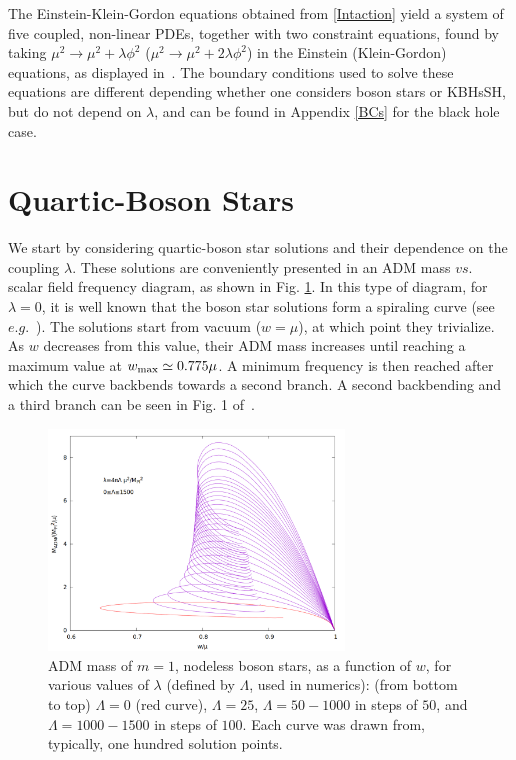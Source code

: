 The Einstein-Klein-Gordon equations obtained from \eqref{Intaction} yield a system of five coupled, non-linear PDEs, together with two constraint equations, found 
by taking $\mu^2\to \mu^2+ \lambda \phi^2$ ($\mu^2\to \mu^2+2\lambda \phi^2$) in the Einstein (Klein-Gordon) equations, as displayed in~\cite{Herdeiro:2015gia}.
The boundary conditions used to solve these
equations are different depending whether one considers boson stars or KBHsSH, but do not depend on $\lambda$, and can be found in Appendix \ref{BCs} for the black hole case.


\section{Quartic-Boson Stars}
\label{sec_II}
We start by considering quartic-boson star solutions and their dependence on the coupling $\lambda$. These solutions are  conveniently presented in an ADM mass $vs.$ scalar field frequency diagram, as shown in Fig. \ref{fig:w-vs-M-BSs}. In this type of diagram, for $\lambda=0$, it is well known that the boson star solutions form a spiraling curve (see $e.g.$~\cite{Herdeiro:2015gia}). The solutions start from vacuum ($w=\mu$), at which point they trivialize. As $w$ decreases from this value, their ADM mass increases until reaching a maximum value at $w_{\rm max}\simeq 0.775 \mu$. A minimum frequency is then reached after which the curve backbends towards a second branch. A second backbending and a third branch can be seen in  Fig. 1 of~\cite{Herdeiro:2015gia}.

\begin{figure}[h!]
  \begin{center}
    \includegraphics[width=0.7\textwidth]{papers/selfInteractions/w-vs-M-BSs2.png}
  \end{center}
  \caption{ADM mass of $m=1$, nodeless boson stars, as a function of $w$, for various values of $\lambda$ (defined by $\Lambda$, used in numerics): (from bottom to top) $\Lambda=0$ (red curve), $\Lambda=25$, $\Lambda=50-1000$ in steps of $50$, and $\Lambda=1000-1500$ in steps of $100$. Each curve was drawn from, typically, one hundred solution points.}
  \label{fig:w-vs-M-BSs}
\end{figure}



